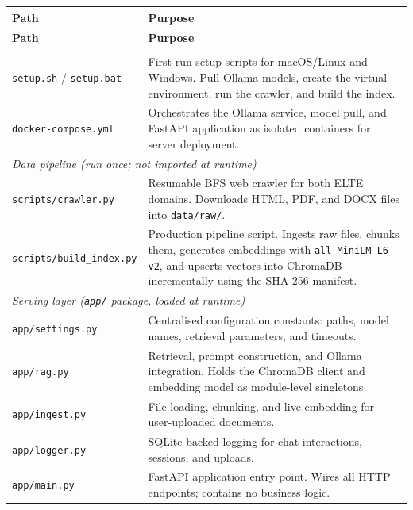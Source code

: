 \begin{longtable}{|l|p{}|}
    \hline
    \textbf{Path} & \textbf{Purpose} \\
    \hline \hline
    \endfirsthead
    \hline
    \textbf{Path} & \textbf{Purpose} \\
    \hline \hline
    \endhead
    \hline
    \endfoot

    \multicolumn{2}{|l|}{\textit{Setup and deployment}} \\
    \hline
    \texttt{setup.sh} / \texttt{setup.bat}  & First-run setup scripts for macOS/Linux and Windows. Pull Ollama models, create the virtual environment, run the crawler, and build the index. \\
    \hline
    \texttt{docker-compose.yml}             & Orchestrates the Ollama service, model pull, and FastAPI application as isolated containers for server deployment. \\
    \hline\hline
    \multicolumn{2}{|l|}{\textit{Data pipeline (run once; not imported at runtime)}} \\
    \hline
    \texttt{scripts/crawler.py}             & Resumable BFS web crawler for both ELTE domains. Downloads HTML, PDF, and DOCX files into \texttt{data/raw/}. \\
    \hline
    \texttt{scripts/build\_index.py}        & Production pipeline script. Ingests raw files, chunks them, generates embeddings with \texttt{all-MiniLM-L6-v2}, and upserts vectors into ChromaDB incrementally using the SHA-256 manifest. \\
    \hline\hline
    \multicolumn{2}{|l|}{\textit{Serving layer (\texttt{app/} package, loaded at runtime)}} \\
    \hline
    \texttt{app/settings.py}       & Centralised configuration constants: paths, model names, retrieval parameters, and timeouts. \\
    \hline
    \texttt{app/rag.py}            & Retrieval, prompt construction, and Ollama integration. Holds the ChromaDB client and embedding model as module-level singletons. \\
    \hline
    \texttt{app/ingest.py}         & File loading, chunking, and live embedding for user-uploaded documents. \\
    \hline
    \texttt{app/logger.py}         & SQLite-backed logging for chat interactions, sessions, and uploads. \\
    \hline
    \texttt{app/main.py}           & FastAPI application entry point. Wires all HTTP endpoints; contains no business logic. \\

\end{longtable}
